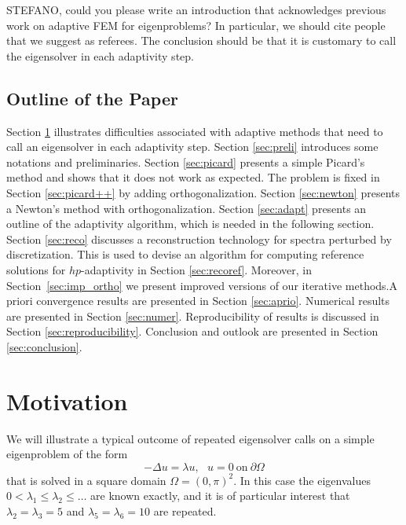 \documentclass[preprint,12pt]{elsarticle}
\begin{document}
{\red STEFANO, could you please write an introduction that acknowledges 
previous work on adaptive FEM for eigenproblems? In particular, we should cite people that we 
suggest as referees. The conclusion should be that it is customary to  
call the eigensolver in each adaptivity step.}

\subsection{Outline of the Paper}

Section \ref{sec:motiv} illustrates difficulties associated with 
adaptive methods that need to call an eigensolver in each adaptivity 
step. Section \ref{sec:preli} introduces some notations and 
preliminaries. Section \ref{sec:picard} presents a simple
Picard's method and shows that it does not work as expected.
The problem is fixed in Section \ref{sec:picard++} by adding 
orthogonalization. Section \ref{sec:newton} presents 
a Newton's method with orthogonalization. 
Section \ref{sec:adapt} presents an outline of the adaptivity algorithm,
which is needed in the following section.
Section \ref{sec:reco}
discusses a reconstruction technology for spectra perturbed 
by discretization. This is used to devise an algorithm for 
computing reference solutions for $hp$-adaptivity in 
Section \ref{sec:recoref}. 
Moreover, in Section~\ref{sec:imp_ortho} we present improved versions of our iterative methods.A priori convergence results 
are presented in Section \ref{sec:aprio}. Numerical results 
are presented in Section \ref{sec:numer}. Reproducibility of 
results is discussed in Section \ref{sec:reproducibility}.
Conclusion and outlook are presented in Section \ref{sec:conclusion}.


\section{Motivation}\label{sec:motiv}

We will illustrate a typical outcome of repeated eigensolver calls
on a simple eigenproblem of the form 
\begin{equation} \label{one}
-\Delta u = \lambda u, \ \ \ u = 0 \ \mbox{on} \ \partial \Omega
\end{equation}
that is solved in a square domain $\Omega = (0, \pi)^2$.
In this case the eigenvalues $0 < \lambda_1 \le \lambda_2 \le \ldots$ 
are known exactly, and it is of particular interest that $\lambda_2 = \lambda_3 = 5$ 
and $\lambda_5 = \lambda_6 = 10$ are repeated. 
\end{document}
